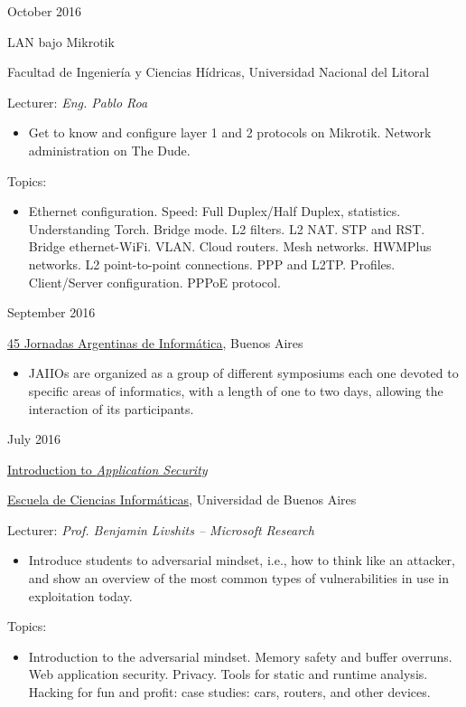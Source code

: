 \documentclass[a4paper,10pt]{article}
\newlength{\cvcolumngapwidth}
\newlength{\cvleftcolumnwidth}
\newlength{\cvrightcolumnwidth}
\newcommand{\cvdurationstyle}[1]{{\small\cvdurationfont\textcolor{cvdurationcolor}{#1}}}
\newcommand{\cvheadingstyle}[1]{{\normalsize\cvheadingfont\textcolor{cvheadingcolor}{#1}}}
\newlength{\cvafteritemskipamount}
\newlength{\cvparskip}
\newcommand{\cvitem}[2]{
    \begin{minipage}[t]{\cvleftcolumnwidth}
        \raggedleft #1
    \end{minipage}%
    \hspace{\cvcolumngapwidth}%
    \begin{minipage}[t]{\cvrightcolumnwidth}
        \setlength{\parskip}{\cvparskip} #2
    \end{minipage}

    \vspace{\cvafteritemskipamount}
}
\begin{document}
\cvitem {
    \cvdurationstyle{October 2016}
}{
    \cvheadingstyle{LAN bajo Mikrotik}
    
    Facultad de Ingeniería y Ciencias Hídricas, Universidad Nacional del Litoral
    
    Lecturer: \textit{Eng. Pablo Roa}
    
    \begin{itemize}[leftmargin=*]
        \item Get to know and configure layer 1 and 2 protocols on Mikrotik. Network administration on The Dude.
    \end{itemize}
    
    Topics:
    \small{
    \begin{itemize}
        \item Ethernet configuration. Speed: Full Duplex/Half Duplex, statistics. Understanding Torch. Bridge mode. L2 filters. L2 NAT. STP and RST. Bridge ethernet-WiFi. VLAN. Cloud routers. Mesh networks. HWMPlus networks. L2 point-to-point connections. PPP and L2TP. Profiles. Client/Server configuration. PPPoE protocol.
    \end{itemize}{}
    }
}
\cvitem {
    \cvdurationstyle{September 2016}
}{
    \cvheadingstyle{\href{http://45jaiio.sadio.org.ar/}{45 Jornadas Argentinas de Informática}}, Buenos Aires
    
    \begin{itemize}[leftmargin=*]
        \item JAIIOs are organized as a group of different symposiums each one devoted to specific areas of informatics, with a length of one to two days, allowing the interaction of its participants.
    \end{itemize}
}
\cvitem {
    \cvdurationstyle{July 2016}
}{
    \cvheadingstyle{\href{https://eci2016.dc.uba.ar/t3.pdf}{Introduction to \textit{Application Security}}}
    
    \href{https://eci2016.dc.uba.ar/}{Escuela de Ciencias Informáticas}, Universidad de Buenos Aires
    
    Lecturer: \textit{Prof. Benjamin Livshits -- Microsoft Research}
    
    \begin{itemize}[leftmargin=*]
        \item Introduce students to adversarial mindset, i.e., how to think like an attacker, and show an overview of the most common types of vulnerabilities in use in exploitation today.
    \end{itemize}
    Topics:
    \small{
    \begin{itemize}
        \item Introduction to the adversarial mindset. Memory safety and buffer overruns. Web application security. Privacy. Tools for static and runtime analysis. Hacking for fun and profit: case studies: cars, routers, and other devices.
    \end{itemize}{}
    }
}
\end{document}
